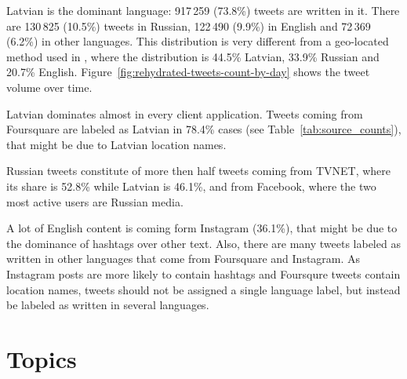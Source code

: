 \documentclass{IOS-Book-Article}
\newcommand{\hl}[1]{#1}
\begin{document}


Latvian is the dominant language: \hl{917\,259 (73.8\%)} tweets are written in it.\footnotemark{} There are \hl{130\,825 (10.5\%)} tweets in Russian, \hl{122\,490 (9.9\%)} in English and \hl{72\,369\, (6.2\%)} in other languages. This distribution is very different from a geo-located method used in \cite{milajevs:2017:BUCC}, where the distribution is 44.5\% Latvian, 33.9\% Russian and 20.7\% English. Figure~\ref{fig:rehydrated-tweets-count-by-day} shows the tweet volume over time.


Latvian dominates almost in every client application. Tweets coming from Foursquare are labeled as Latvian in \hl{78.4\%} cases (see Table~\ref{tab:source_counts}), that might be due to Latvian location names.

Russian tweets constitute of more then half tweets coming from TVNET, where its share is \hl{52.8\%} while Latvian is \hl{46.1\%}, and from Facebook, where the two most active users are Russian media.

A lot of English content is coming form Instagram (\hl{36.1\%}), that might be due to the dominance of hashtags over other text. Also, there are many tweets labeled as written in other languages that come from Foursquare and Instagram. As Instagram posts are more likely to contain hashtags and Foursqure tweets contain location names, tweets should not be assigned a single language label, but instead be labeled as written in several languages.



\section{Topics}
\label{sec:topics}
\end{document}
